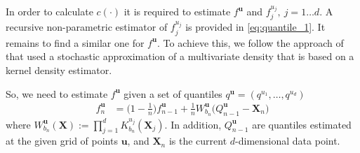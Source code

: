 \documentclass[12pt]{article}
\begin{document}
	In order to calculate $ c(\cdot) $ it is required to estimate $ f^{\mathbf{u}} $ and $ f_j^{u_j}, ~j = 1\dots d $. A recursive non-parametric estimator of $ f_j^{u_j} $ is provided in \eqref{eq:quantile_1}. It remains to find a similar one for $ f^{\mathbf{u}} $. To achieve this, we follow the approach of \textcite{Mokkadem2009} that used a stochastic approximation of a multivariate density that is based on a kernel density estimator.
	
	So, we need to estimate $ f^{\mathbf{u}} $ given a set of quantiles $ q^{\mathbf{u}} = (q^{u_1}, \dots, q^{u_d}) $
	\begin{align}
		f^{\mathbf{u}}_n &= \bigg(1 - \frac{1}{n}\bigg)f^{\mathbf{u}}_{n-1} + \frac{1}{n} W_{b_n}^{\mathbf{u}} \big(Q_{n-1}^{\mathbf{u}} - \mathbf{X}_n\big) \label{eq:joint}
	\end{align}
	where $ W_{b_n}^{\mathbf{u}}(\mathbf{X}) := \prod_{j=1}^{d}K_{b_{n}}^{u_j}(\mathbf{X}_j) $. In addition, $ Q_{n-1}^{\mathbf{u}} $ are quantiles estimated at the given grid of points $ \mathbf{u} $, and $ \mathbf{X}_n $ is the current $ d $-dimensional data point.
	
\end{document}
